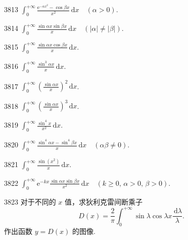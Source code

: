 
\begin{prob}[S]{3813}
$\displaystyle \int_0^{+\infty} \frac{\mathrm{e}^{-\alpha x^2}-\cos\beta x}{x^2} \,\mathrm{d}x \quad (\alpha>0)$.
\end{prob}

\begin{prob}[S]{3814}
$\displaystyle \int_0^{+\infty} \frac{\sin\alpha x \sin\beta x}{x} \,\mathrm{d}x \quad (|\alpha|\neq|\beta|)$.
\end{prob}

\begin{prob}[S]{3815}
$\displaystyle \int_0^{+\infty} \frac{\sin\alpha x \cos\beta x}{x} \,\mathrm{d}x$.
\end{prob}

\begin{prob}[S]{3816}
$\displaystyle \int_0^{+\infty} \frac{\sin^3 \alpha x}{x} \,\mathrm{d}x$.
\end{prob}

\begin{prob}[S]{3817}
$\displaystyle \int_0^{+\infty} \left(\frac{\sin\alpha x}{x}\right)^2 \,\mathrm{d}x$.
\end{prob}

\begin{prob}[S]{3818}
$\displaystyle \int_0^{+\infty} \left(\frac{\sin\alpha x}{x}\right)^3 \,\mathrm{d}x$.
\end{prob}

\begin{prob}[S]{3819}
$\displaystyle \int_0^{+\infty} \frac{\sin^4 x}{x^2} \,\mathrm{d}x$.
\end{prob}

\begin{prob}[S]{3820}
$\displaystyle \int_0^{+\infty} \frac{\sin^4 \alpha x - \sin^4 \beta x}{x} \,\mathrm{d}x \quad (\alpha\beta\neq 0)$.
\end{prob}

\begin{prob}[S]{3821}
$\displaystyle \int_0^{+\infty} \frac{\sin(x^2)}{x} \,\mathrm{d}x$.
\end{prob}

\begin{prob}[S]{3822}
$\displaystyle \int_0^{+\infty} \mathrm{e}^{-kx} \frac{\sin\alpha x \sin\beta x}{x^2} \,\mathrm{d}x \quad (k\geqslant 0,\, \alpha>0,\, \beta>0)$.
\end{prob}

\begin{prob}[M]{3823}
对于不同的 $x$ 值，求狄利克雷间断乘子
\[
D(x) = \frac{2}{\pi} \int_0^{+\infty} \sin\lambda \cos\lambda x \frac{\,\mathrm{d}\lambda}{\lambda}.
\]
作出函数 $y = D(x)$ 的图像.
\end{prob}

